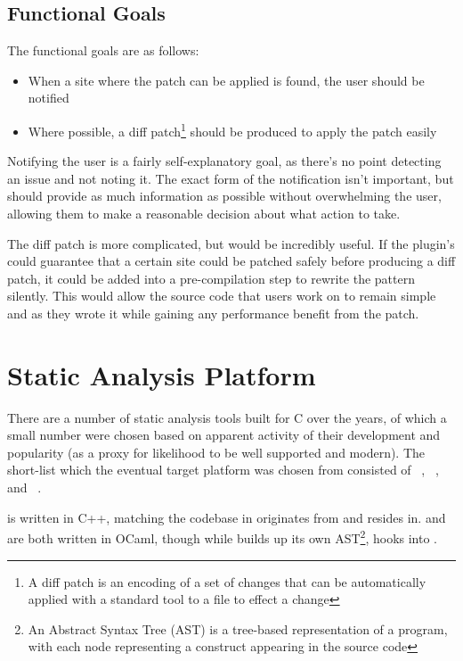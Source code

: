 \subsection{Functional Goals}

The functional goals are as follows:

\begin{itemize}
	\item When a site where the patch can be applied is found, the user should be notified
	\item Where possible, a diff patch\footnote{A diff patch is an encoding of a set of changes that can be automatically applied with a standard tool to a file to effect a change} should be produced to apply the patch easily
\end{itemize}

Notifying the user is a fairly self-explanatory goal, as there's no point detecting an issue and not noting it. The exact form of the notification isn't important, but should provide as much information as possible without overwhelming the user, allowing them to make a reasonable decision about what action to take.

The diff patch is more complicated, but would be incredibly useful. If the plugin's could guarantee that a certain site could be patched safely before producing a diff patch, it could be added into a pre-compilation step to rewrite the pattern silently. This would allow the source code that users work on to remain simple and as they wrote it while gaining any performance benefit from the patch.

\section{Static Analysis Platform}

There are a number of static analysis tools built for C over the years, of which a small number were chosen based on apparent activity of their development and popularity (as a proxy for likelihood to be well supported and modern). The short-list which the eventual target platform was chosen from consisted of ~\cite{clang-analyzer}, ~\cite{frama}, and ~\cite{fbinfer}.

 is written in C++, matching the  codebase in originates from and resides in.  and  are both written in OCaml, though while  builds up its own AST\footnote{An Abstract Syntax Tree (AST) is a tree-based representation of a program, with each node representing a construct appearing in the source code},  hooks into .

